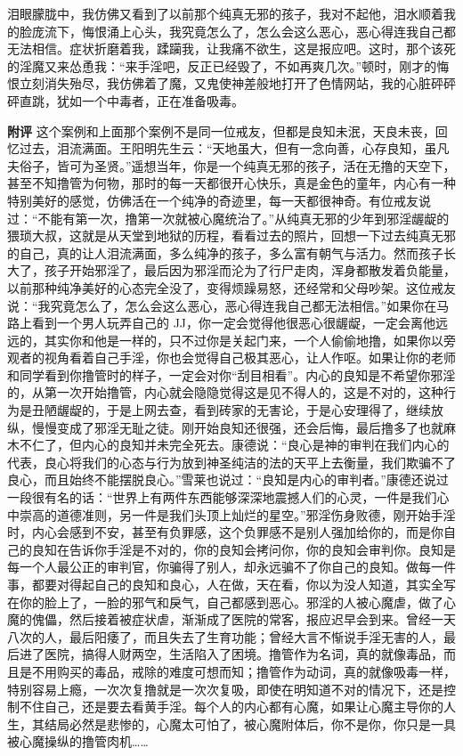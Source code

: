 \begin{case}
    泪眼朦胧中，我仿佛又看到了以前那个纯真无邪的孩子，我对不起他，泪水顺着我的脸庞流下，悔恨涌上心头，我究竟怎么了，怎么会这么恶心，恶心得连我自己都无法相信。症状折磨着我，蹂躏我，让我痛不欲生，这是报应吧。这时，那个该死的淫魔又来怂恿我：“来手淫吧，反正已经毁了，不如再爽几次。”顿时，刚才的悔恨立刻消失殆尽，我仿佛着了魔，又鬼使神差般地打开了色情网站，我的心脏砰砰砰直跳，犹如一个中毒者，正在准备吸毒。

    \textbf{附评} 这个案例和上面那个案例不是同一位戒友，但都是良知未泯，天良未丧，回忆过去，泪流满面。王阳明先生云：“天地虽大，但有一念向善，心存良知，虽凡夫俗子，皆可为圣贤。”遥想当年，你是一个纯真无邪的孩子，活在无撸的天空下，甚至不知撸管为何物，那时的每一天都很开心快乐，真是金色的童年，内心有一种特别美好的感觉，仿佛活在一个纯净的奇迹里，每一天都很神奇。有位戒友说过：“不能有第一次，撸第一次就被心魔统治了。”从纯真无邪的少年到邪淫龌龊的猥琐大叔，这就是从天堂到地狱的历程，看看过去的照片，回想一下过去纯真无邪的自己，真的让人泪流满面，多么纯净的孩子，多么富有朝气与活力。然而孩子长大了，孩子开始邪淫了，最后因为邪淫而沦为了行尸走肉，浑身都散发着负能量，以前那种纯净美好的心态完全没了，变得烦躁易怒，还经常和父母吵架。这位戒友说：“我究竟怎么了，怎么会这么恶心，恶心得连我自己都无法相信。”如果你在马路上看到一个男人玩弄自己的 JJ，你一定会觉得他很恶心很龌龊，一定会离他远远的，其实你和他是一样的，只不过你是关起门来，一个人偷偷地撸，如果你以旁观者的视角看着自己手淫，你也会觉得自己极其恶心，让人作呕。如果让你的老师和同学看到你撸管时的样子，一定会对你“刮目相看”。内心的良知是不希望你邪淫的，从第一次开始撸管，内心就会隐隐觉得这是见不得人的，这是不对的，这种行为是丑陋龌龊的，于是上网去查，看到砖家的无害论，于是心安理得了，继续放纵，慢慢变成了邪淫无耻之徒。刚开始良知还很强，还会后悔，最后撸多了也就麻木不仁了，但内心的良知并未完全死去。康德说：“良心是神的审判在我们内心的代表，良心将我们的心态与行为放到神圣纯洁的法的天平上去衡量，我们欺骗不了良心，而且始终不能摆脱良心。”雪莱也说过：“良知是内心的审判者。”康德还说过一段很有名的话：“世界上有两件东西能够深深地震撼人们的心灵，一件是我们心中崇高的道德准则，另一件是我们头顶上灿烂的星空。”邪淫伤身败德，刚开始手淫时，内心会感到不安，甚至有负罪感，这个负罪感不是别人强加给你的，而是你自己的良知在告诉你手淫是不对的，你的良知会拷问你，你的良知会审判你。良知是每一个人最公正的审判官，你骗得了别人，却永远骗不了你自己的良知。做每一件事，都要对得起自己的良知和良心，人在做，天在看，你以为没人知道，其实全写在你的脸上了，一脸的邪气和戾气，自己都感到恶心。邪淫的人被心魔虐，做了心魔的傀儡，然后接着被症状虐，渐渐成了医院的常客，报应迟早会到来。曾经一天八次的人，最后阳痿了，而且失去了生育功能；曾经大言不惭说手淫无害的人，最后进了医院，搞得人财两空，生活陷入了困境。撸管作为名词，真的就像毒品，而且是不用购买的毒品，戒除的难度可想而知；撸管作为动词，真的就像吸毒一样，特别容易上瘾，一次次复撸就是一次次复吸，即使在明知道不对的情况下，还是控制不住自己，还是要去看黄手淫。每个人的内心都有心魔，如果让心魔主导你的人生，其结局必然是悲惨的，心魔太可怕了，被心魔附体后，你不是你，你只是一具被心魔操纵的撸管肉机……
\end{case}

